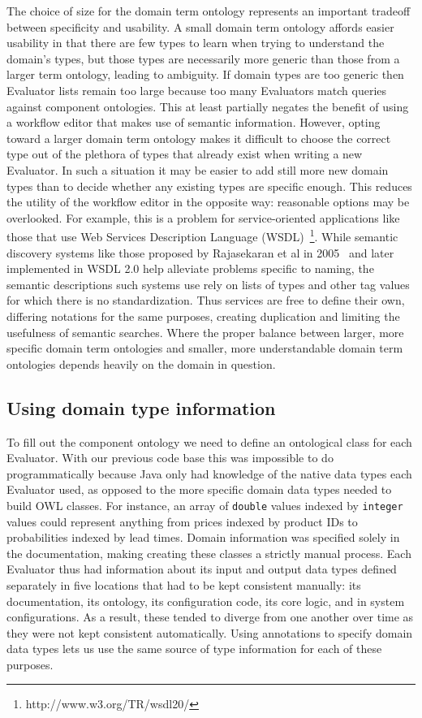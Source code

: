 \documentclass{article}
\begin{document}
The choice of size for the domain term ontology represents an important tradeoff between specificity and usability.
A small domain term ontology affords easier usability in that there are few types to learn when trying to understand the domain's types, but those types are necessarily more generic than those from a larger term ontology, leading to ambiguity.
If domain types are too generic then Evaluator lists remain too large because too many Evaluators match queries against component ontologies.
This at least partially negates the benefit of using a workflow editor that makes use of semantic information.
However, opting toward a larger domain term ontology makes it difficult to choose the correct type out of the plethora of types that already exist when writing a new Evaluator.
In such a situation it may be easier to add still more new domain types than to decide whether any existing types are specific enough.
This reduces the utility of the workflow editor in the opposite way:  reasonable options may be overlooked.
For example, this is a problem for service-oriented applications like those that use Web Services Description Language (WSDL)~\footnote{http://www.w3.org/TR/wsdl20/}.
While semantic discovery systems like those proposed by Rajasekaran et al in 2005~\cite{rajasekaran2005enhancing} and later implemented in WSDL 2.0 help alleviate problems specific to naming, the semantic descriptions such systems use rely on lists of types and other tag values for which there is no standardization.
Thus services are free to define their own, differing notations for the same purposes, creating duplication and limiting the usefulness of semantic searches.
Where the proper balance between larger, more specific domain term ontologies and smaller, more understandable domain term ontologies depends heavily on the domain in question.

\subsection{Using domain type information}

To fill out the component ontology we need to define an ontological class for each Evaluator.
With our previous code base this was impossible to do programmatically because Java only had knowledge of the native data types each Evaluator used, as opposed to the more specific domain data types needed to build OWL classes.
For instance, an array of \texttt{double} values indexed by \texttt{integer} values could represent anything from prices indexed by product IDs to probabilities indexed by lead times.
Domain information was specified solely in the documentation, making creating these classes a strictly manual process.
Each Evaluator thus had information about its input and output data types defined separately in five locations that had to be kept consistent manually:  its documentation, its ontology, its configuration code, its core logic, and in system configurations.
As a result, these tended to diverge from one another over time as they were not kept consistent automatically.
Using annotations to specify domain data types lets us use the same source of type information for each of these purposes.
\end{document}
